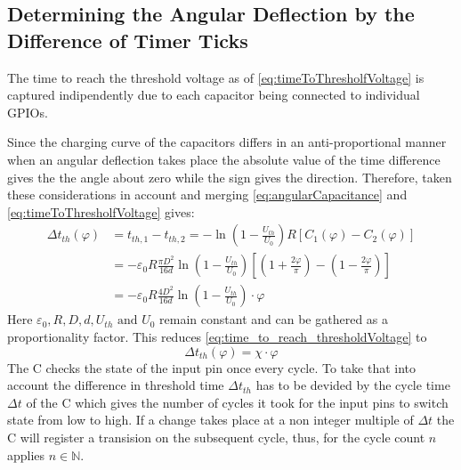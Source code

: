     \subsection*{Determining the Angular Deflection by the Difference of Timer Ticks}\label{sec:preparation_task_7}
        The time to reach the threshold voltage as of \cref{eq:timeToThresholfVoltage} is captured indipendently due to
        each capacitor being connected to individual GPIOs.\par
        Since the charging curve of the capacitors differs in an anti-proportional manner when an angular deflection takes
        place the absolute value of the time difference gives the the angle about zero while the sign gives the direction.
        Therefore, taken these considerations in account and merging \cref{eq:angularCapacitance} and \cref{eq:timeToThresholfVoltage}
        gives:
        \begin{align}
            \Delta t_{th}(\varphi)   &= t_{th,1} - t_{th,2} = -\ln\left( 1- \frac{U_{th}}{U_0} \right)R\left[ C_1(\varphi) - C_2(\varphi) \right] \nonumber \\
                            &= -\varepsilon_0 R \frac{\pi D^2}{16d} \ln\left( 1 - \frac{U_{th}}{U_0} \right) \left[ \left( 1 + \frac{2\varphi}{\pi} \right) - \left( 1 - \frac{2\varphi}{\pi} \right) \right] \nonumber \\
                            &= -\varepsilon_0 R \frac{4D^2}{16d} \ln\left( 1 - \frac{U_{th}}{U_0} \right) \cdot \varphi
            \label{eq:time_to_reach_thresholdVoltage}
        \end{align}
        Here \( \varepsilon_0, R, D, d, U_{th} \text{ and } U_0 \) remain constant and can be gathered as a proportionality
        factor. This reduces \cref{eq:time_to_reach_thresholdVoltage} to
        \begin{equation}
            \Delta t_{th}(\varphi) = \chi \cdot \varphi
            \label{eq:simplified_time_to_reach_thresholdVoltage}
        \end{equation}
        The \micro C checks the state of the input pin once every cycle. To take that into account the difference in threshold time
        \( \Delta t_{th} \) has to be devided by the cycle time \( \Delta t \) of the \micro C which gives the number of cycles it took for the
        input pins to switch state from low to high. If a change takes place at a non integer multiple of \( \Delta t \)
        the \micro C will register a transision on the subsequent cycle, thus, for the cycle count \( n \) applies \( n \in \mathbb{N} \).
